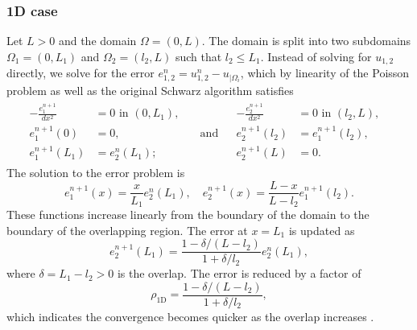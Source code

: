 \subsubsection{1D case}
Let $L>0$ and the domain $\Omega = (0,L)$. The domain is split into two subdomains $\Omega_1 = (0,L_1)$ and $\Omega_2 = (l_2,L)$ such that $l_2\leq L_1$. Instead of solving for $u_{1,2}$ directly, we solve for the error $e^n_{1,2} = u^{n}_{1,2} - u_{|\Omega_i}$, which by linearity of the Poisson problem as well as the original Schwarz algorithm satisfies
\[
  \begin{array}{cc}
    \begin{aligned}
      -\frac{e_1^{n+1}}{d x^2} & = 0           \text { in } (0,L_1), &                  \\
      e_1^{n+1}(0)             & = 0,                                & \quad \text{and} \\
      e_1^{n+1}(L_1)           & = e_2^n(L_1);                       &
    \end{aligned} &
    \begin{aligned}
      -\frac{e_2^{n+1}}{d x^2} & = 0                \text { in } (l_2, L), & \\
      e_2^{n+1}(l_2)           & = e_1^{n+1}(l_2),                         & \\
      e_2^{n+1}(L)             & = 0.                                      &
    \end{aligned}
  \end{array}
\]
The solution to the error problem is
\[
  e_1^{n+1}(x) = \frac{x}{L_1}e_2^n(L_1), \quad e_2^{n+1}(x) = \frac{L-x}{L - l_2}e_1^{n+1}(l_2).
\]
These functions increase linearly from the boundary of the domain to the boundary of the overlapping region. The error at $x = L_1$ is updated as
\[
  e_2^{n+1}(L_1) = \frac{1 - \delta/(L-l_2)}{1 + \delta/l_2} e_2^n(L_1),
\]
where $\delta = L_1 - l_2 > 0 $ is the overlap. The error is reduced by a factor of
\begin{equation}
  \rho_{\text{1D}} = \frac{1 - \delta/(L-l_2)}{1 + \delta/l_2},
  \label{eq:1D_Schwarz_convergence}
\end{equation}
which indicates the convergence becomes quicker as the overlap increases \cite[Section 1.5.1]{schwarz_methods_Dolean_2015}.


